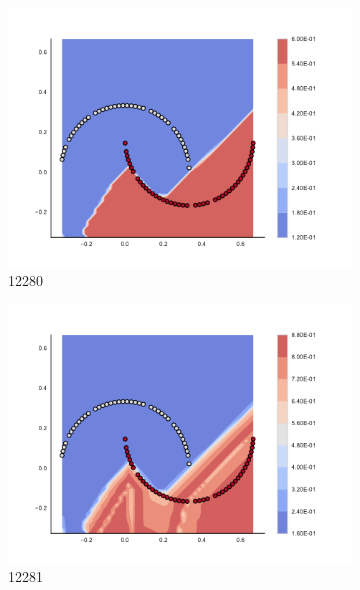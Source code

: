 \begin{figure}[h]
\begin{subfigure}[b]{0.09\textwidth}
    \includegraphics[clip, trim=2.35cm 1.75cm 4.5cm 0cm,width=\textwidth]{img/convergence/12280.pdf}
    \caption{12280}
    \label{fig:convergence_12280}
\end{subfigure}
%
\begin{subfigure}[b]{0.09\textwidth}
    \includegraphics[clip, trim=2.35cm 1.75cm 4.5cm 0cm,width=\textwidth]{img/convergence/12281.pdf}
    \caption{12281}
    \label{fig:convergence_12281}
\end{subfigure}
%
\begin{subfigure}[b]{0.09\textwidth}

\end{subfigure}
\end{figure}
